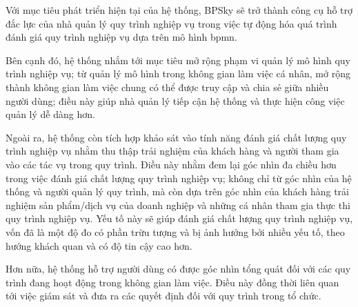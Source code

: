 
Với mục tiêu phát triển hiện tại của hệ thống, BPSky sẽ trở thành công cụ hỗ trợ đắc lực của nhà quản lý quy trình nghiệp vụ trong việc tự động hóa quá trình đánh giá quy trình nghiệp vụ dựa trên mô hình \acrfull*{bpmn}.

Bên cạnh đó, hệ thống nhắm tới mục tiêu mở rộng phạm vi quản lý mô hình quy trình nghiệp vụ; từ quản lý mô hình trong không gian làm việc cá nhân, mở rộng thành không gian làm việc chung có thể được truy cập và chia sẻ giữa nhiều người dùng; điều này giúp nhà quản lý tiếp cận hệ thống và thực hiện công việc quản lý dễ dàng hơn.

Ngoài ra, hệ thống còn tích hợp khảo sát vào tính năng đánh giá chất lượng quy trình nghiệp vụ nhằm thu thập trải nghiệm của khách hàng và người tham gia vào các tác vụ trong quy trình. Điều này nhằm đem lại góc nhìn đa chiều hơn trong việc đánh giá chất lượng quy trình nghiệp vụ; không chỉ từ góc nhìn của hệ thống và người quản lý quy trình, mà còn dựa trên góc nhìn của khách hàng trải nghiệm sản phẩm/dịch vụ của doanh nghiệp và những cá nhân tham gia thực thi quy trình nghiệp vụ. Yếu tố này sẽ giúp đánh giá chất lượng quy trình nghiệp vụ, vốn đã là một độ đo có phần trừu tượng và bị ảnh hưởng bởi nhiều yếu tố, theo hướng khách quan và có độ tin cậy cao hơn.

Hơn nữa, hệ thống hỗ trợ người dùng có được góc nhìn tổng quát đối với các quy trình đang hoạt động trong không gian làm việc. Điều này đồng thời liên quan tới việc giám sát và đưa ra các quyết định đối với quy trình trong tổ chức.